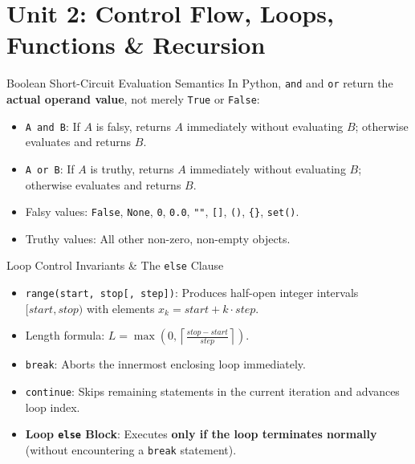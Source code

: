 \chapter{Unit 2: Control Flow, Loops, Functions \& Recursion}

\begin{formulabox}{Boolean Short-Circuit Evaluation Semantics}
In Python, \texttt{and} and \texttt{or} return the \textbf{actual operand value}, not merely \texttt{True} or \texttt{False}:
\begin{itemize}[leftmargin=1.5em, itemsep=2pt]
    \item \texttt{A and B}: If $A$ is falsy, returns $A$ immediately without evaluating $B$; otherwise evaluates and returns $B$.
    \item \texttt{A or B}: If $A$ is truthy, returns $A$ immediately without evaluating $B$; otherwise evaluates and returns $B$.
    \item Falsy values: \texttt{False}, \texttt{None}, \texttt{0}, \texttt{0.0}, \texttt{""}, \texttt{[]}, \texttt{()}, \texttt{\{\}}, \texttt{set()}.
    \item Truthy values: All other non-zero, non-empty objects.
\end{itemize}
\end{formulabox}

\begin{formulabox}{Loop Control Invariants \& The \texttt{else} Clause}
\begin{itemize}[leftmargin=1.5em, itemsep=2pt]
    \item \texttt{range(start, stop[, step])}: Produces half-open integer intervals $[start, stop)$ with elements $x_k = start + k \cdot step$.
    \item Length formula: $L = \max\left(0, \left\lceil \frac{stop - start}{step} \right\rceil\right)$.
    \item \texttt{break}: Aborts the innermost enclosing loop immediately.
    \item \texttt{continue}: Skips remaining statements in the current iteration and advances loop index.
    \item \textbf{Loop \texttt{else} Block}: Executes \textbf{only if the loop terminates normally} (without encountering a \texttt{break} statement).
\end{itemize}
\end{formulabox}

